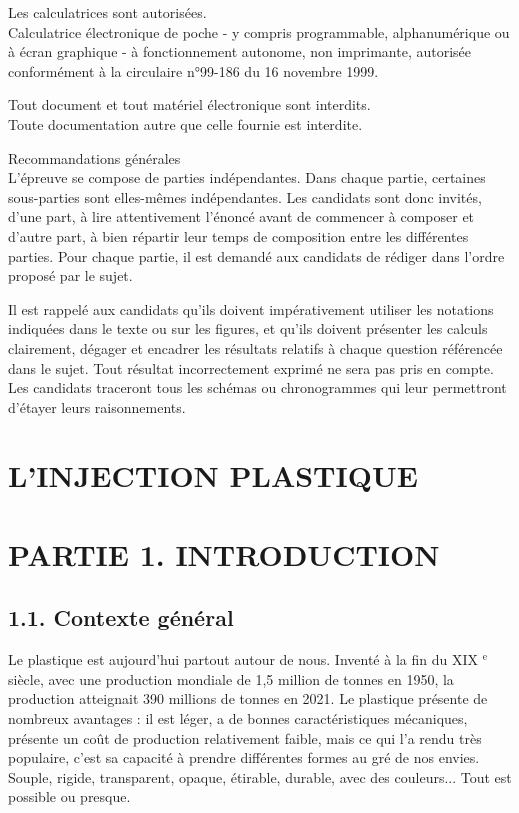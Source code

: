 \documentclass[10pt]{article}
\begin{document}
Les calculatrices sont autorisées.\\
Calculatrice électronique de poche - y compris programmable, alphanumérique ou à écran graphique - à fonctionnement autonome, non imprimante, autorisée conformément à la circulaire n°99-186 du 16 novembre 1999.

Tout document et tout matériel électronique sont interdits.\\
Toute documentation autre que celle fournie est interdite.

Recommandations générales\\
L'épreuve se compose de parties indépendantes. Dans chaque partie, certaines sous-parties sont elles-mêmes indépendantes. Les candidats sont donc invités, d'une part, à lire attentivement l'énoncé avant de commencer à composer et d'autre part, à bien répartir leur temps de composition entre les différentes parties. Pour chaque partie, il est demandé aux candidats de rédiger dans l'ordre proposé par le sujet.

Il est rappelé aux candidats qu'ils doivent impérativement utiliser les notations indiquées dans le texte ou sur les figures, et qu'ils doivent présenter les calculs clairement, dégager et encadrer les résultats relatifs à chaque question référencée dans le sujet. Tout résultat incorrectement exprimé ne sera pas pris en compte. Les candidats traceront tous les schémas ou chronogrammes qui leur permettront d'étayer leurs raisonnements.

\section*{L'INJECTION PLASTIQUE}
\section*{PARTIE 1. INTRODUCTION}
\subsection*{1.1. Contexte général}
Le plastique est aujourd'hui partout autour de nous. Inventé à la fin du XIX ${ }^{\mathrm{e}}$ siècle, avec une production mondiale de 1,5 million de tonnes en 1950, la production atteignait 390 millions de tonnes en 2021. Le plastique présente de nombreux avantages : il est léger, a de bonnes caractéristiques mécaniques, présente un coût de production relativement faible, mais ce qui l'a rendu très populaire, c'est sa capacité à prendre différentes formes au gré de nos envies. Souple, rigide, transparent, opaque, étirable, durable, avec des couleurs... Tout est possible ou presque.
\end{document}

